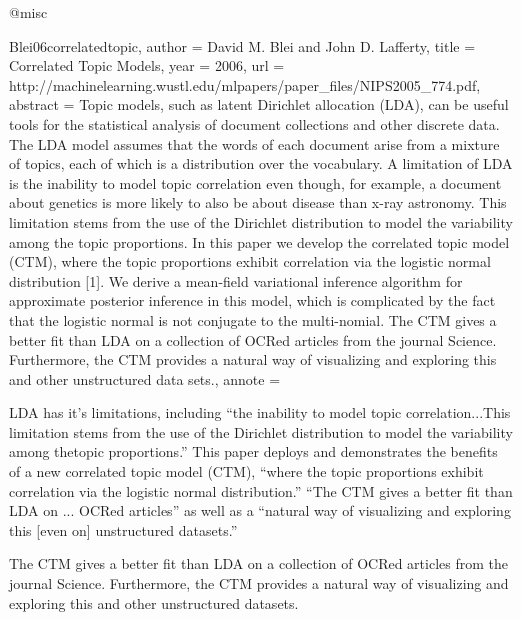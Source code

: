@misc{Blei06correlatedtopic,
	author = {David M. Blei and John D. Lafferty},
	title = {Correlated Topic Models},
	year = {2006},
	url = {http://machinelearning.wustl.edu/mlpapers/paper_files/NIPS2005_774.pdf},
	abstract = {Topic models, such as latent Dirichlet allocation (LDA), can be useful tools for the statistical analysis of document collections and other discrete data. The LDA model assumes that the words of each document arise from a mixture of topics, each of which is a distribution over the vocabulary. A limitation of LDA is the inability to model topic correlation even though, for example, a document about genetics is more likely to also be about disease than x-ray astronomy. This limitation stems from the use of the Dirichlet distribution to model the variability among the topic proportions. In this paper we develop the correlated topic model (CTM), where the topic proportions exhibit correlation via the logistic normal distribution [1]. We derive a mean-field variational inference algorithm for approximate posterior inference in this model, which is complicated by the fact that the logistic normal is not conjugate to the multi-nomial. The CTM gives a better fit than LDA on a collection of OCRed articles from the journal Science. Furthermore, the CTM provides a natural way of visualizing and exploring this and other unstructured data
sets.},
	annote = {LDA has it's limitations, including ``the inability to model topic correlation...This limitation stems from the use of the Dirichlet distribution to model the variability among thetopic proportions.'' This paper deploys and demonstrates the benefits of a new correlated topic model (CTM), ``where the topic proportions exhibit correlation via the logistic normal distribution.'' ``The CTM gives a better fit than LDA on ... OCRed articles'' as well as a ``natural way of visualizing and exploring this [even on] unstructured datasets.''

The CTM gives a better fit than LDA on a collection of OCRed articles from the journal Science. Furthermore, the CTM provides a natural way of visualizing and exploring this and other unstructured datasets.}
}


